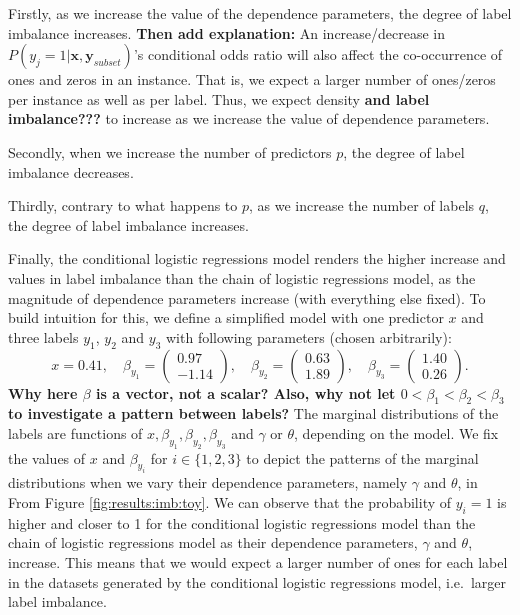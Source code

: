 \documentclass[review]{elsarticle}
\begin{document}
{Firstly, as we increase the value of the dependence parameters, the degree of label imbalance increases. 
{\bf Then add explanation:}
	An increase/decrease in $P(y_{j} = 1|\mathbf{x},\mathbf{y}_{subset})$'s conditional odds ratio will also affect the co-occurrence of ones and zeros in an instance. That is, we expect a larger number of ones/zeros per instance as well as per label. Thus, we expect density {\bf and label imbalance???} to increase as we increase the value of dependence parameters.  


Secondly, when we increase the number of predictors $p$, the degree of label imbalance decreases.

Thirdly, contrary to what happens to $p$, as we increase the number of labels $q$, the degree of label imbalance increases.

Finally, the conditional logistic regressions model renders the higher increase and values in label imbalance than the chain of logistic regressions model, as the magnitude of dependence parameters increase (with everything else fixed).
To build intuition for this, we define a simplified model with one predictor $x$ and three labels $y_{1}$, $y_{2}$ and $y_{3}$ with following parameters (chosen arbitrarily):
%
\begin{equation}\label{TOY}
x = 0.41, \quad \beta_{y_{1}} = \left(\begin{array}{r} 0.97\\-1.14 \end{array} \right), \quad \beta_{y_{2}} = \left(\begin{array}{r} 0.63\\1.89 \end{array} \right), \quad \beta_{y_{3}} = \left(\begin{array}{r} 1.40\\0.26 \end{array} \right).
\end{equation}
{\bf Why here $\beta$ is a vector, not a scalar?  Also, why not let $0< \beta_1 < \beta_2 < \beta_3$ to investigate a pattern between labels?}
%
The marginal distributions of the labels are functions of $x,\beta_{y_{1}},\beta_{y_{2}},\beta_{y_{3}}$ and $\gamma$ or $\theta$, depending on the model. We fix the values of $x$ and $\beta_{y_{i}}$ for $i \in \{1, 2, 3\}$ to depict the patterns of the marginal distributions when we vary their dependence parameters, namely $\gamma$ and $\theta$, in From Figure \ref{fig:results:imb:toy}.  
We can observe that the probability of $y_{i}=1$ is higher and closer to 1 for the conditional logistic regressions model than the chain of logistic regressions model as their dependence parameters, $\gamma$ and $\theta$, increase. This means that we would expect a larger number of ones for each label in the datasets generated by the conditional logistic regressions model, i.e.~larger label imbalance.

}
\end{document}
